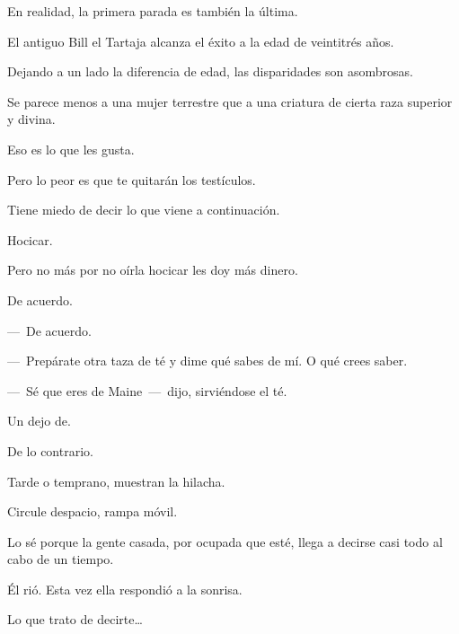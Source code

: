 \sk
En realidad, la primera parada es también la última.\nb{}

\sk
El antiguo Bill el Tartaja alcanza el éxito a la edad de veintitrés años. 

\sk
 Dejando a un lado la diferencia de edad, las disparidades son asombrosas. \nb{}

\sk
Se parece menos a una mujer terrestre que a una criatura de cierta raza superior y divina. \nb{}

\sk
Eso es lo que les gusta. 

\sk
 Pero lo peor es que te quitarán los testículos. \nb{}

\sk
Tiene miedo de decir lo que viene a continuación. 

\sk
Hocicar. 

\sk
Pero no más por no oírla hocicar les doy más dinero. 

\sk
De acuerdo. 

\sk
---~De acuerdo.

---~Prepárate otra taza de té y dime qué sabes de mí. O qué crees saber. 

\sk
---~Sé que eres de Maine~---~dijo, sirviéndose el té.  \nb{}

\sk
Un dejo de. 

\sk
De lo contrario. 

\sk
Tarde o temprano, muestran la hilacha. 

\sk
 Circule despacio, rampa móvil. 

\sk
Lo sé porque la gente casada, por ocupada que esté, llega a decirse casi todo al cabo de un tiempo. 

\sk
Él rió. Esta vez ella respondió a la sonrisa. \nb{}

\sk
Lo que trato de decirte\ldots{} 

